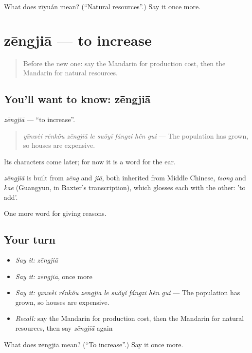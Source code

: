\begin{tcolorbox}[breakable,colback=teal!4,colframe=teal!35!black,title={Before you move on}]
What does zīyuán mean? (\textquotedblleft{}Natural resources\textquotedblright{}.) Say it once more.
\end{tcolorbox}
\section[zēngjiā]{zēngjiā — to increase}

\label{lesson:ZH-C384-zengjia}



\begin{quote}
Before the new one: say the Mandarin for production cost, then the Mandarin for natural resources.
\end{quote}

\subsection*{You'll want to know: zēngjiā}
\emph{zēngjiā} — \textquotedblleft{}to increase\textquotedblright{}.

\begin{quote}
\emph{yīnwèi rénkǒu zēngjiā le suǒyǐ fángzi hěn guì} — The population has grown, so houses are expensive.
\end{quote}

Its characters come later; for now it is a word for the ear.

\begin{cousinweb}
\emph{zēngjiā} is built from \emph{zēng} and \emph{jiā}, both inherited from Middle Chinese, \emph{tsong} and \emph{kae} (Guangyun, in Baxter's transcription), which glosses each with the other: 'to add'.
\end{cousinweb}

\begin{grammarlens}[title={What you've built}]
One more word for giving reasons.
\end{grammarlens}

\subsection*{Your turn}
\begin{itemize}
\raggedright
  \item \emph{Say it:} \emph{zēngjiā}
  \item \emph{Say it:} \emph{zēngjiā}, once more
  \item \emph{Say it:} \emph{yīnwèi rénkǒu zēngjiā le suǒyǐ fángzi hěn guì} — The population has grown, so houses are expensive.
  \item \emph{Recall:} say the Mandarin for production cost, then the Mandarin for natural resources, then say \emph{zēngjiā} again
\end{itemize}

\begin{tcolorbox}[breakable,colback=teal!4,colframe=teal!35!black,title={Before you move on}]
What does zēngjiā mean? (\textquotedblleft{}To increase\textquotedblright{}.) Say it once more.
\end{tcolorbox}
